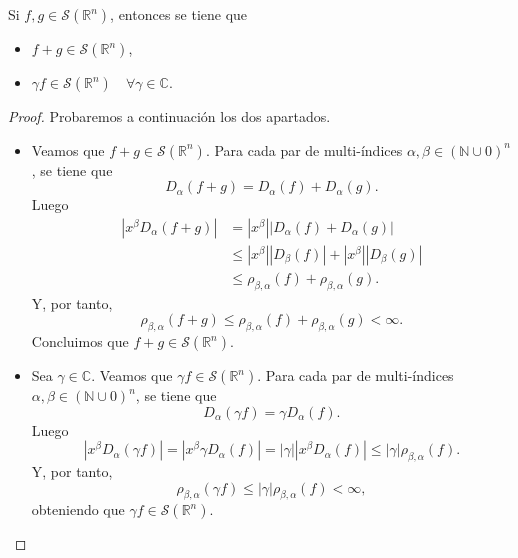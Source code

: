 \begin{proposicion}\label{prodif2}
    Si $f,g \in \mathscr{S}(\mathbb{R}^n)$, entonces se tiene que 
    \begin{itemize}
        \item $f+g \in \mathscr{S}(\mathbb{R}^n)$,
        \item $\gamma f \in \mathscr{S}(\mathbb{R}^n) \quad \forall \gamma \in \mathbb{C}$.
    \end{itemize}
\end{proposicion}

\begin{proof}
Probaremos a continuación los dos apartados.
    \begin{itemize}
        \item Veamos que $f+g \in \mathscr{S}(\mathbb{R}^n)$. Para cada par de multi-índices $\alpha, \beta \in (\mathbb{N} \cup {0})^n$, se tiene que 
        \begin{equation}
            D_{\alpha}(f+g) =   D_{\alpha}(f)+ D_{\alpha}(g).
        \end{equation}
        Luego
       \begin{align}
        |x^{\beta}D_{\alpha}(f+g)| 
        &= |x^{\beta}||D_{\alpha}(f)+ D_{\alpha}(g)| \\
        &\leq |x^{\beta}||D_{\beta}(f)| + |x^{\beta}||D_{\beta}(g)| \\
        &\leq \rho_{\beta,\alpha}(f)+\rho_{\beta,\alpha}(g).
        \end{align}
        Y, por tanto, 
        \begin{equation}
            \rho_{\beta,\alpha}(f+g) \leq \rho_{\beta,\alpha}(f)+\rho_{\beta,\alpha}(g) < \infty.
        \end{equation}
        Concluimos que $f+g \in \mathscr{S}(\mathbb{R}^n)$.

        \item Sea $\gamma \in \mathbb{C}$. Veamos que $\gamma f \in \mathscr{S}(\mathbb{R}^n)$.  Para cada par de multi-índices $\alpha, \beta \in (\mathbb{N} \cup {0})^n$, se tiene que 
        \begin{equation}
            D_{\alpha}(\gamma f) =  \gamma D_{\alpha}(f).
        \end{equation}
        Luego
       \begin{equation}
        |x^{\beta}D_{\alpha}(\gamma f)| 
        = |x^{\beta}\gamma D_{\alpha}(f)|
        = |\gamma||x^{\beta}D_{\alpha}(f)| 
        \leq |\gamma|\rho_{\beta,\alpha}(f).
        \end{equation}
        Y, por tanto, 
        \begin{equation}
        \rho_{\beta,\alpha}(\gamma f) \leq |\gamma|\rho_{\beta,\alpha}(f) < \infty,
        \end{equation}
        obteniendo que $\gamma f \in \mathscr{S}(\mathbb{R}^n)$. \qedhere


        
        \end{itemize}        
\end{proof}
    



